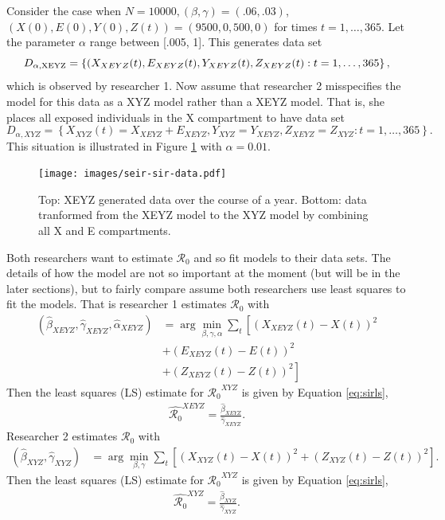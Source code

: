 \documentclass[12pt]{article}
\newcommand{\rr}{\ensuremath{\mathcal{R}_0}}
\begin{document}
Consider the case when $N=10000, (\beta, \gamma) = (.06, .03)$, $(X(0), E(0), Y(0), Z(t)) = (9500, 0, 500, 0)$ for times $t=1, \dots, 365$.  Let the parameter $\alpha$ range between [.005, 1].  This generates data set
$$D_{\alpha, \textnormal{XEYZ}} = \left \{(X_{XEYZ}(t), E_{XEYZ}(t), Y_{XEYZ}(t), Z_{XEYZ}(t): t=1, \dots, 365\right \},$$
which is observed by researcher 1.  Now assume that researcher 2 misspecifies the model for this data as a XYZ model rather than a XEYZ model.  That is, she places all exposed individuals in the X compartment to have data set
$$D_{\alpha, XYZ} = \left \{X_{XYZ}(t) = X_{XEYZ} + E_{XEYZ}, Y_{XYZ} = Y_{XEYZ}, Z_{XEYZ} = Z_{XYZ} : t = 1, \dots, 365 \right \}.$$
This situation is illustrated in Figure \ref{fig:sir-vs-seir} with $\alpha = 0.01$.

\begin{figure}
  \centering
  \texttt{[image: images/seir-sir-data.pdf]}
  \caption{Top: XEYZ generated data over the course of a year.  Bottom: data tranformed from the XEYZ model to the XYZ model by combining all X and E compartments.}\label{fig:sir-vs-seir}
  \end{figure}

Both researchers want to estimate $\rr$ and so fit models to their data sets.  The details of how the model are not so important at the moment (but will be in the later sections), but to fairly compare assume both researchers use least squares to fit the models.  That is researcher 1 estimates $\rr$ with
\begin{align*}
  (\hat{\beta}_{XEYZ}, \hat{\gamma}_{XEYZ}, \hat{\alpha}_{XEYZ} )&=\arg \min_{\beta, \gamma, \alpha} \sum_{t} \left [ \left (X_{XEYZ}(t) - X(t)\right )^2  \right . \\
                                                                 &+\left ( E_{XEYZ}(t) - E(t) \right )^2  \\
  &\left . + \left ( Z_{XEYZ}(t) - Z(t) \right )^2\right ]
\end{align*}
Then the least squares (LS) estimate for $\rr^{XYZ}$ is given by Equation \ref{eq:sirls},
\begin{align*}
  \hat{\rr}^{XEYZ}= \frac{\hat{\beta}_{XEYZ}}{\hat{\gamma}_{XEYZ}}.
\end{align*}
Researcher 2 estimates $\rr$ with 
\begin{align*}
(\hat{\beta}_{XYZ}, \hat{\gamma}_{XYZ} )&=\arg \min_{\beta, \gamma} \sum_{t} \left [ \left (X_{XYZ}(t) - X(t)\right )^2 + \left ( Z_{XYZ}(t) - Z(t) \right )^2 \right ].
\end{align*}
Then the least squares (LS) estimate for $\rr^{XYZ}$ is given by Equation \ref{eq:sirls},
\begin{align*}
  \hat{\rr}^{XYZ}= \frac{\hat{\beta}_{XYZ}}{\hat{\gamma}_{XYZ}}.
\end{align*}
\end{document}
